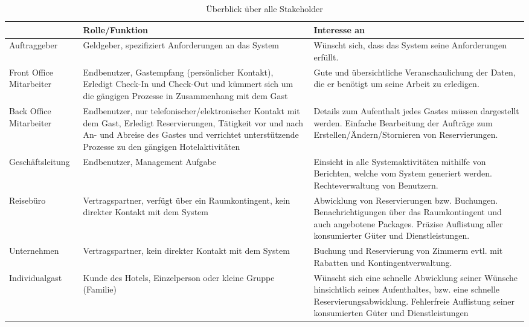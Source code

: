 \centering
\begin{longtable}{|p{3.5cm}|p{5cm}|p{6cm}|}
    \caption{Überblick über alle Stakeholder}
    \hline
    & Rolle/Funktion & Interesse an \\       \hline

    Auftraggeber &
    Geldgeber, spezifiziert Anforderungen an das System &
    Wünscht sich, dass das System seine Anforderungen erfüllt.
    \\       \hline

    Front Office Mitarbeiter &
    Endbenutzer, Gastempfang (persönlicher Kontakt), Erledigt Check-In und Check-Out und kümmert sich um die gängigen Prozesse in Zusammenhang mit dem Gast  &
    Gute und übersichtliche Veranschaulichung der Daten, die er benötigt um seine Arbeit zu erledigen.
    \\       \hline

    Back Office Mitarbeiter &
    Endbenutzer, nur telefonischer/elektronischer Kontakt mit dem Gast, Erledigt Reservierungen, Tätigkeit vor und nach An- und Abreise des Gastes und verrichtet unterstützende Prozesse zu den gängigen Hotelaktivitäten &
    Details zum Aufenthalt jedes Gastes müssen dargestellt werden. Einfache Bearbeitung der Aufträge zum Erstellen/Ändern/Stornieren von Reservierungen.
    \\       \hline

    Geschäftsleitung &
    Endbenutzer, Management Aufgabe &
    Einsicht in alle Systemaktivitäten mithilfe von Berichten, welche vom System generiert werden.
    Rechteverwaltung von Benutzern.
    \\       \hline

    Reisebüro &
    Vertragspartner, verfügt über ein Raumkontingent, kein direkter Kontakt mit dem System &
    Abwicklung von Reservierungen bzw. Buchungen. Benachrichtigungen über das Raumkontingent und auch angebotene
    Packages. Präzise Auflistung aller konsumierter Güter und Dienstleistungen.
    \\       \hline

    Unternehmen &
    Vertragspartner, kein direkter Kontakt mit dem System &
    Buchung und Reservierung von Zimmerm evtl. mit Rabatten und Kontingentverwaltung.
    \\       \hline

    Individualgast &
    Kunde des Hotels, Einzelperson oder kleine Gruppe (Familie) &
    Wünscht sich eine schnelle Abwicklung seiner Wünsche hinsichtlich seines Aufenthaltes, bzw. eine schnelle Reservierungsabwicklung.
    Fehlerfreie Auflistung seiner konsumierten Güter und Dienstleistungen
    \\       \hline


\end{longtable}
